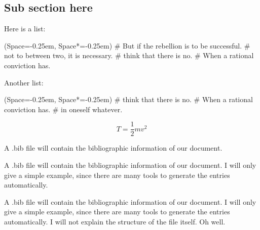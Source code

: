 \documentclass[12pt, a4paper, twoside]{article}%
\numberwithin{equation}{section}
\newcommand{\listSpace}{-0.25em}
\begin{document}
\subsection{Sub section here}
\blindtext


Here is a list:
\begin{easylist}[itemize]
	\ListProperties(Space=\listSpace, Space*=\listSpace)
	# But if the rebellion is to be successful.
	# not to  between two, it is necessary.
	# think that there is no.
	# When a rational conviction has.
\end{easylist}


Another list:
\begin{easylist}[enumerate]
	\ListProperties(Space=\listSpace, Space*=\listSpace)
	# think that there is no.
	# When a rational conviction has.
	# in oneself whatever.
\end{easylist}

\begin{equation}
	T = \frac{1}{2}m v^2
\end{equation}

A .bib file will contain the bibliographic information of our document.

A .bib file will contain the bibliographic information of our document. I will only give a simple example, since there are many tools to generate the entries automatically.

A .bib file will contain the bibliographic information of our document. I will only give a simple example, since there are many tools to generate the entries automatically. I will not explain the structure of the file itself. Oh well.


\end{document}
